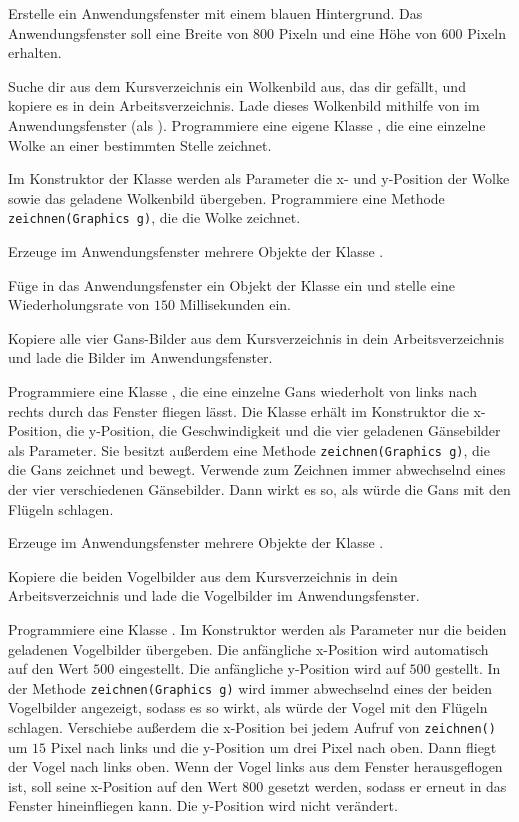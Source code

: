 \begin{compactenum}[a)]
\item Erstelle ein Anwendungsfenster mit einem blauen Hintergrund. Das
Anwendungsfenster soll eine Breite von $800$ Pixeln und eine Höhe von $600$
Pixeln erhalten.

\item Suche dir aus dem Kursverzeichnis ein Wolkenbild aus, das dir gefällt,
und kopiere es in dein Arbeitsverzeichnis. Lade dieses Wolkenbild mithilfe von
 im Anwendungsfenster (als ).
Programmiere eine eigene Klasse , die eine einzelne Wolke an
einer bestimmten Stelle zeichnet.

Im Konstruktor der Klasse werden als Parameter die x- und y-Position der Wolke
sowie das geladene Wolkenbild übergeben. Programmiere eine Methode
\lstinline|zeichnen(Graphics g)|, die die Wolke zeichnet.

Erzeuge im Anwendungsfenster mehrere Objekte der Klasse .

\item Füge in das Anwendungsfenster ein Objekt der Klasse  ein
und stelle eine Wiederholungsrate von $150$ Millisekunden ein.

\item Kopiere alle vier Gans-Bilder aus dem Kursverzeichnis in dein
Arbeitsverzeichnis und lade die Bilder im Anwendungsfenster.

Programmiere eine Klasse , die eine einzelne Gans wiederholt von
links nach rechts durch das Fenster fliegen lässt. Die Klasse erhält im
Konstruktor die x-Position, die y-Position, die Geschwindigkeit und die vier
geladenen Gänsebilder als Parameter. Sie besitzt außerdem eine Methode
\lstinline|zeichnen(Graphics g)|, die die Gans zeichnet und bewegt. Verwende
zum Zeichnen immer abwechselnd eines der vier verschiedenen Gänsebilder. Dann
wirkt es so, als würde die Gans mit den Flügeln schlagen.

Erzeuge im Anwendungsfenster mehrere Objekte der Klasse .

\item Kopiere die beiden Vogelbilder aus dem Kursverzeichnis in dein
Arbeitsverzeichnis und lade die Vogelbilder im Anwendungsfenster.

Programmiere eine Klasse . Im Konstruktor werden als Parameter
nur die beiden geladenen Vogelbilder übergeben. Die anfängliche x-Position
wird automatisch auf den Wert $500$ eingestellt. Die anfängliche y-Position wird
auf $500$ gestellt. In der Methode \lstinline|zeichnen(Graphics g)| wird immer
abwechselnd eines der beiden Vogelbilder angezeigt, sodass es so wirkt, als
würde der Vogel mit den Flügeln schlagen. Verschiebe außerdem die x-Position bei
jedem Aufruf von \lstinline|zeichnen()| um $15$ Pixel nach links und die
y-Position um drei Pixel nach oben. Dann fliegt der Vogel nach links oben. Wenn
der Vogel links aus dem Fenster herausgeflogen ist, soll seine x-Position auf
den Wert $800$ gesetzt werden, sodass er erneut in das Fenster hineinfliegen
kann. Die y-Position wird nicht verändert.


\end{compactenum}
